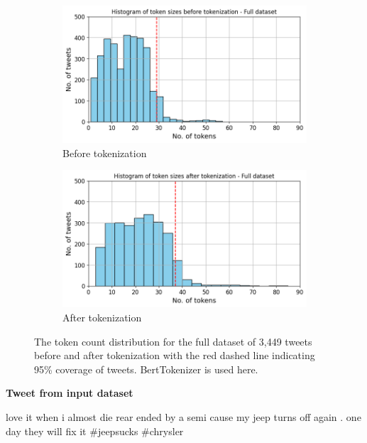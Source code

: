 \begin{figure}[htbp]
    \centering
    \captionsetup{font=small}
    \begin{subfigure}[b]{0.48\textwidth}
        \includegraphics[width=\textwidth]{figures/token_hist.png}
        \caption{Before tokenization}
        \label{fig: token_hist}
    \end{subfigure}
    \hfill
    \begin{subfigure}[b]{0.48\textwidth}
        \includegraphics[width=\textwidth]{figures/token_pp_hist.png}
        \caption{After tokenization}
        \label{fig: token_pp_hist}
    \end{subfigure}
    \caption{The token count distribution for the full dataset of 3,449 tweets before and after tokenization with the red dashed line indicating 95\% coverage of tweets. BertTokenizer is used here.}
    \label{fig: bef_aft_token}
\end{figure}



\textbf{Tweet from input dataset}\newline

\begin{adjustbox}{minipage={\textwidth},fbox}
    love it when i almost die rear ended by a semi cause my jeep turns off again . one day they will fix it \#jeepsucks \#chrysler
\end{adjustbox} \newline\newline


